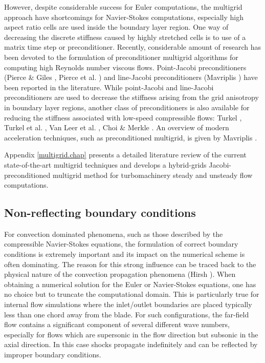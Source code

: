  However, despite considerable success for Euler computations,
 the multigrid approach have shortcomings for Navier-Stokes computations,
 especially high aspect ratio cells are used inside the boundary layer
 region.
 One way of decreasing the discrete stiffness caused by highly stretched cells
 is to use of a matrix time step or preconditioner.
 Recently, considerable amount of research has been devoted to the formulation
 of preconditioner multigrid algorithms for computing high Reynolds number
 viscous flows.
 Point-Jacobi preconditioners (Pierce \& Giles ,
 Pierce et al. ) and line-Jacobi preconditioners
 (Mavriplis ) have been reported in the
 literature.
 While point-Jacobi and line-Jacobi preconditioners are used to
 decrease the stiffness arising from the grid anisotropy in boundary layer regions,
 another class of preconditioners is also available for reducing the stiffness
 associated with low-speed compressible flows:
 Turkel \citeyear{Turkel:4,Turkel:5}, Turkel et al. \citeyear{Turkel:7},
 Van Leer et al. \citeyear{Leer:6}, Choi \& Merkle \citeyear{Choi:1}.
 An overview of modern acceleration techniques, such as preconditioned multigrid,
 is given by Mavriplis \citeyear{Mavriplis:5}.

 Appendix \ref{multigrid.chap} presents a detailed literature review of the
 current state-of-the-art multigrid techniques and develops a hybrid-grids
 Jacobi-preconditioned multigrid method for turbomachinery
 steady and unsteady flow computations.
%
%
%
%
\subsection{Non-reflecting boundary conditions}
%
 For convection dominated phenomena, such as those described by the 
 compressible Navier-Stokes equations, the formulation of correct boundary
 conditions is extremely important and its impact on the numerical scheme
 is often dominating.
 The reason for this strong influence can be traced back to the physical nature of
 the convection propagation phenomena (Hirsh ).
 When obtaining a numerical solution for the Euler or Navier-Stokes
 equations, one has no choice but to truncate the computational domain.
 This is particularly true for internal flow simulations where
 the inlet/outlet boundaries are placed typically less
 than one chord away from the blade.
 For such configurations, the far-field flow contains a significant
 component of several different wave numbers, especially
 for flows which are supersonic in the flow direction but
 subsonic in the axial direction. In this case shocks propagate indefinitely
 and can be reflected by improper boundary conditions.

